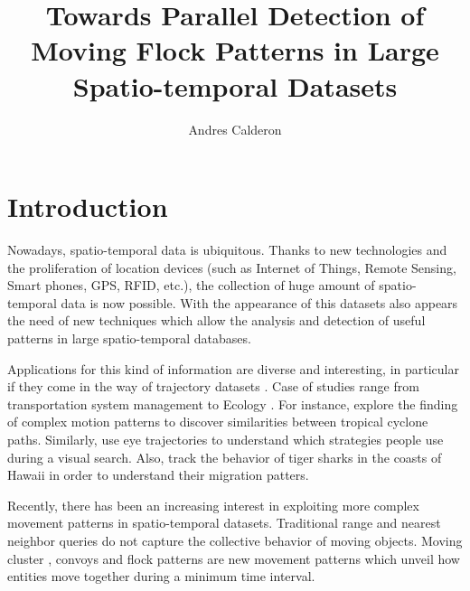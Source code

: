 \documentclass[12pt]{scrartcl}
\title{Towards Parallel Detection of Moving Flock Patterns in Large Spatio-temporal Datasets}
\author{Andres Calderon}
\begin{document}
\maketitle
 
\section{Introduction}
% 

Nowadays, spatio-temporal data is ubiquitous. Thanks to new technologies and the proliferation of location devices (such as Internet of Things, Remote Sensing, Smart phones, GPS, RFID, etc.), the collection of huge amount of spatio-temporal data is now possible. With the appearance of this datasets also appears the need of new techniques which allow the analysis and detection of useful patterns in large spatio-temporal databases.  

Applications for this kind of information are diverse and interesting, in particular if they come in the way of trajectory datasets \citep{jeung_trajectory_2011, huang_mining_2015}. Case of studies range from transportation system management \citep{di_lorenzo_allaboard:_2016,johansson_efficiency_2015} to Ecology \citep{johnston_abundance_2015, la_sorte_convergence_2016}.  For instance, \cite{turdukulov_visual_2014} explore the finding of complex motion patterns to discover similarities between tropical cyclone paths.  Similarly, \cite{amor_persistence_2016} use eye trajectories to understand which strategies people use during a visual search. Also, \cite{holland_movements_1999} track the behavior of tiger sharks in the coasts of Hawaii in order to understand their migration patters.

Recently, there has been an increasing interest in exploiting more complex movement patterns in spatio-temporal datasets.  Traditional range and nearest neighbor queries do not capture the collective behavior of moving objects.  Moving cluster \citep{kalnis_discovering_2005}, convoys \citep{jeung_discovery_2008} and flock patterns \citep{benkert_reporting_2008, gudmundsson_computing_2006} are new movement patterns which unveil how entities move together during a minimum time interval.  
\end{document}
